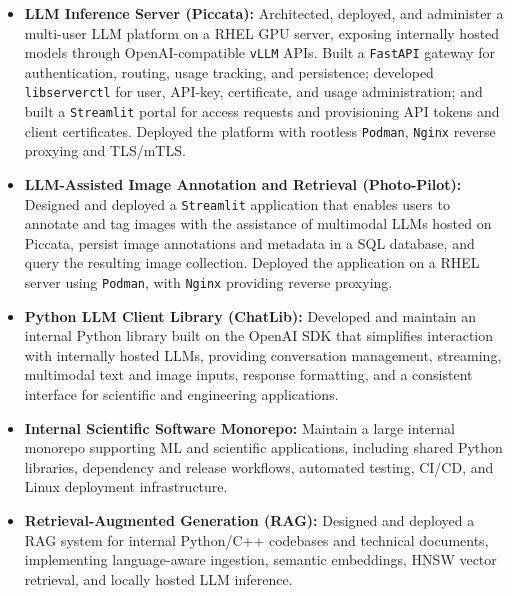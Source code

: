 \documentclass[11pt]{article}
\begin{document}
\begin{itemize}[leftmargin=*,nosep]
    \item \textbf{LLM Inference Server (Piccata):}
    Architected, deployed, and administer a multi-user LLM platform on a RHEL 
    GPU server, exposing internally hosted models through OpenAI-compatible
    \texttt{vLLM} APIs. Built a \texttt{FastAPI} gateway for authentication,
    routing, usage tracking, and persistence; developed \texttt{libserverctl}
    for user, API-key, certificate, and usage administration; and built a
    \texttt{Streamlit} portal for access requests and provisioning API tokens
    and client certificates. Deployed the platform with rootless \texttt{Podman},
    \texttt{Nginx} reverse proxying and TLS/mTLS.

    \item \textbf{LLM-Assisted Image Annotation and Retrieval (Photo-Pilot):}
    Designed and deployed a \texttt{Streamlit} application that enables users to
    annotate and tag images with the assistance of multimodal LLMs hosted on
    Piccata, persist image annotations and metadata in a SQL database, and query
    the resulting image collection. Deployed the application on a RHEL server using
    \texttt{Podman}, with \texttt{Nginx} providing reverse proxying.

    \item \textbf{Python LLM Client Library (ChatLib):}
    Developed and maintain an internal Python library built on the OpenAI SDK
    that simplifies interaction with internally hosted LLMs, providing conversation
    management, streaming, multimodal text and image inputs, response formatting,
    and a consistent interface for scientific and engineering applications.

    \item \textbf{Internal Scientific Software Monorepo:}
    Maintain a large internal monorepo supporting ML and scientific
    applications, including shared Python libraries, dependency and release
    workflows, automated testing, CI/CD, and Linux deployment infrastructure.

    \item \textbf{Retrieval-Augmented Generation (RAG):}
    Designed and deployed a RAG system for internal Python/C++ codebases and
    technical documents, implementing language-aware ingestion, semantic
    embeddings, HNSW vector retrieval, and locally hosted LLM inference.

\end{itemize}
\end{document}
